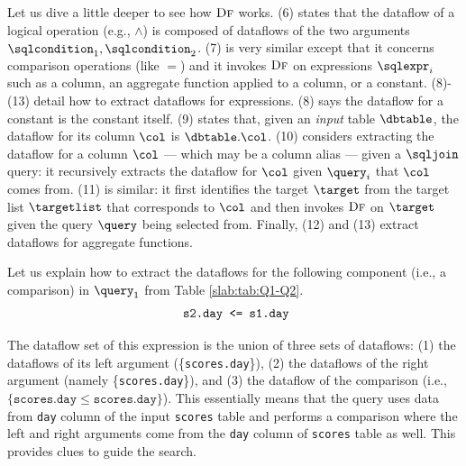 Let us dive a little deeper to see how $\textsc{Df}$ works. 
(6) states that the dataflow of a logical operation (e.g., $\land$) is composed of dataflows of the two arguments $\sqlcondition_1, \sqlcondition_2$. (7) is very similar except that it concerns comparison operations (like $=$) and it invokes $\textsc{Df}$ on expressions $\sqlexpr_i$ such as a column, an aggregate function applied to a column, or a constant. 
(8)-(13) detail how to extract dataflows for expressions. 
(8) says the dataflow for a constant is the constant itself. 
(9) states that, given an \emph{input} table $\dbtable$, the dataflow for its column $\col$ is $\dbtable.\col$. 
(10) considers extracting the dataflow for a column $\col$ --- which may be a column alias --- given a $\sqljoin$ query: it recursively extracts the dataflow for $\col$ given $\query_i$ that $\col$ comes from. 
(11) is similar: it first identifies the target $\target$ from the target list $\targetlist$ that corresponds to $\col$ and then invokes $\textsc{Df}$ on $\target$ given the query $\query$ being selected from. 
Finally, (12) and (13) extract dataflows for aggregate functions. 

\begin{example}
Let us explain how to extract the dataflows for the following component (i.e., a comparison) in $\query_1$ from Table \ref{slab:tab:Q1-Q2}.
$$
\text{
\texttt{s2.day <= s1.day}}
$$

The dataflow set of this expression is the union of three sets of dataflows: (1) the dataflows of its left argument (\{\texttt{scores.day}\}), (2) the dataflows of the right argument (namely \{\texttt{scores.day}\}), and (3) the dataflow of the comparison (i.e., $\{\texttt{scores.day} \leq \texttt{scores.day}\}$). This essentially means that the query uses  data from \texttt{day} column of the input \texttt{scores} table and performs a comparison where the left and right arguments come from the \texttt{day} column of \texttt{scores} table as well. This provides clues to guide the search. 
\end{example}

